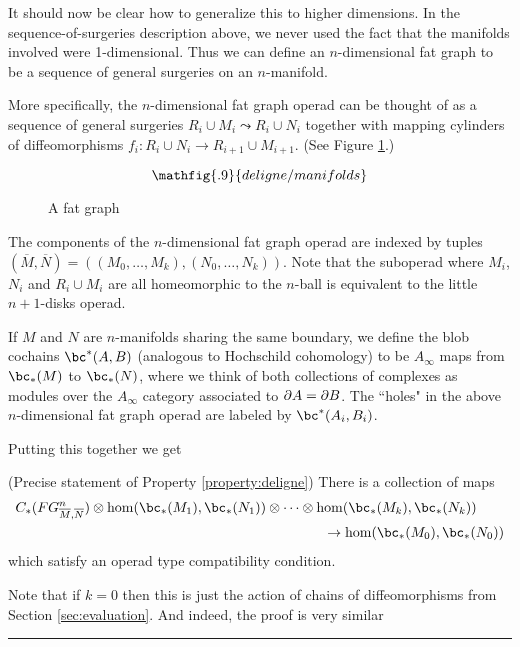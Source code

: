 It should now be clear how to generalize this to higher dimensions.
In the sequence-of-surgeries description above, we never used the fact that the manifolds
involved were 1-dimensional.
Thus we can define an $n$-dimensional fat graph to be a sequence of general surgeries
on an $n$-manifold.


More specifically,
the $n$-dimensional fat graph operad can be thought of as a sequence of general surgeries
$R_i \cup M_i \leadsto R_i \cup N_i$ together with mapping cylinders of diffeomorphisms
$f_i: R_i\cup N_i \to R_{i+1}\cup M_{i+1}$.
(See Figure \ref{delfig2}.)
\begin{figure}[!ht]
$$\mathfig{.9}{deligne/manifolds}$$
\caption{A fat graph}\label{delfig2}
\end{figure}






The components of the $n$-dimensional fat graph operad are indexed by tuples
$(\overline{M}, \overline{N}) = ((M_0,\ldots,M_k), (N_0,\ldots,N_k))$.
Note that the suboperad where $M_i$, $N_i$ and $R_i\cup M_i$ are all homeomorphic to 
the $n$-ball is equivalent to the little $n{+}1$-disks operad.


If $M$ and $N$ are $n$-manifolds sharing the same boundary, we define
the blob cochains $\bc^*(A, B)$ (analogous to Hochschild cohomology) to be
$A_\infty$ maps from $\bc_*(M)$ to $\bc_*(N)$, where we think of both
collections of complexes as modules over the $A_\infty$ category associated to $\partial A = \partial B$.
The ``holes" in the above 
$n$-dimensional fat graph operad are labeled by $\bc^*(A_i, B_i)$.

Putting this together we get 
\begin{prop}(Precise statement of Property \ref{property:deligne})
\label{prop:deligne}
There is a collection of maps
\begin{eqnarray*}
	C_*(FG^n_{\overline{M}, \overline{N}})\otimes \hom(\bc_*(M_1), \bc_*(N_1))\otimes\cdots\otimes 
\hom(\bc_*(M_{k}), \bc_*(N_{k})) & \\
	& \hspace{-11em}\to  \hom(\bc_*(M_0), \bc_*(N_0))
\end{eqnarray*}
which satisfy an operad type compatibility condition. 
\end{prop}

Note that if $k=0$ then this is just the action of chains of diffeomorphisms from Section \ref{sec:evaluation}.
And indeed, the proof is very similar 



\medskip
\hrule\medskip

